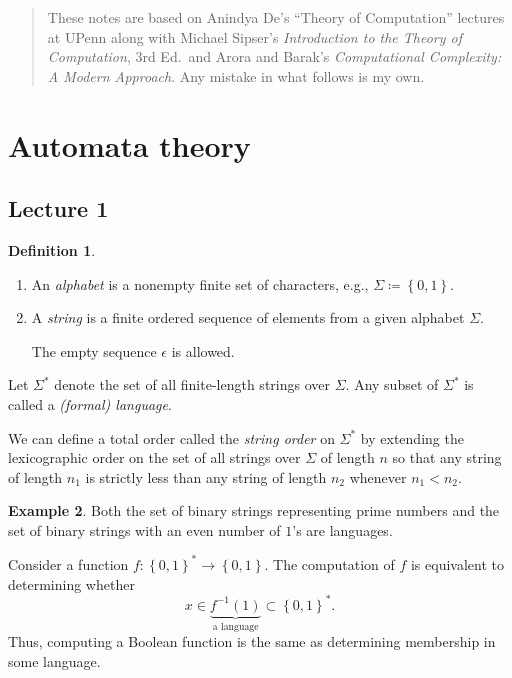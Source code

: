 \documentclass[10pt,letterpaper,cm]{nupset}
\theoremstyle{definition}
\newtheorem{definition}{Definition}[subsection]
\newtheorem{exmp}[definition]{Example}
\theoremstyle{theorem}
\theoremstyle{remark}
\newcommand{\1}{\mathbf{1}}
\newcommand{\0}{\vec 0}
\begin{document}
\thispagestyle{empty}
\begin{abstract}
These notes are based on Anindya De's ``Theory of Computation'' lectures at UPenn along with Michael Sipser's \textit{Introduction to the Theory of Computation}, 3rd Ed.\ and Arora and Barak's \textit{Computational Complexity: A Modern Approach}. Any mistake in what follows is my own.
\end{abstract}

\tableofcontents
\newpage

\section{Automata theory}

\subsection{Lecture 1}

\begin{definition} $ $
\begin{enumerate}
\item An \textit{alphabet} is a nonempty finite set of characters, e.g., $\Sigma \coloneqq \left\{0,1\right\}$. 
\item A \textit{string} is a finite ordered sequence of elements from a given alphabet $\Sigma$. 

The empty sequence $\epsilon$ is allowed.
\end{enumerate}
\end{definition}

Let $\Sigma^{\ast}$ denote the set of all finite-length strings over $\Sigma$. Any subset of $\Sigma^{\ast}$ is called a \textit{(formal) language}.

\medskip

We can define a total order called the \textit{string order} on $\Sigma^{\ast}$ by extending the  lexicographic order on the set of all strings over $\Sigma$ of length $n$ so that any string of length $n_1$ is strictly less than any string of length $n_2$ whenever $n_1<n_2$.

\begin{exmp}
Both the set of binary strings representing prime numbers and the set of binary strings with an even number of $1$'s are languages. 
\end{exmp}

\smallskip

Consider a function $f: \left\{0,1\right\}^{\ast} \to \left\{0,1\right\}$. The computation of $f$ is equivalent to determining whether $$x\in \underbrace{f^{-1}(1)}_{\text{a language}} \subset \left\{0,1\right\}^{\ast}.$$ Thus, computing a Boolean function is the same as determining membership in some language.
\end{document}
